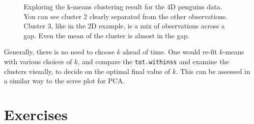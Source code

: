 \documentclass[
  letterpaper,
]{krantz}
\begin{document}
\begin{figure}


\caption{\label{fig-p-km-pdf}Exploring the k-means clustering result for
the 4D penguins data. You can see cluster 2 clearly separated from the
other observations. Cluster 3, like in the 2D example, is a mix of
observations across a gap. Even the mean of the cluster is almost in the
gap.}

\end{figure}%

Generally, there is no need to choose \(k\) ahead of time. One would
re-fit \(k\)-means with various choices of \(k\), and compare the
\texttt{tot.withinss} and examine the clusters visually, to decide on
the optimal final value of \(k\). This can be assessed in a similar way
to the scree plot for PCA.

\section*{Exercises}\label{exercises-8}

\end{document}
